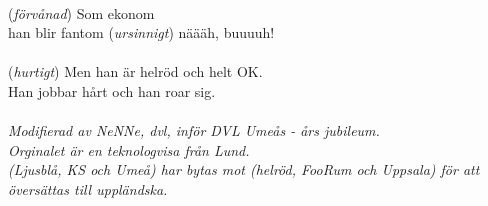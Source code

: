 \\
(\textit{förvånad}) Som ekonom\\
han blir fantom (\textit{ursinnigt}) näääh, buuuuh!\\
\\
(\textit{hurtigt}) \revrpt Men han är helröd och helt OK.\\
Han jobbar hårt och han roar sig.\rpt\\
\\
{\footnotesize\textit{Modifierad av NeNNe, dvl, inför
    DVL Umeås  - års jubileum.\\ Orginalet är en
    teknologvisa från Lund.\\ (Ljusblå, KS och Umeå) har bytas mot
    (helröd, FooRum och Uppsala) för att översättas till uppländska.}}
